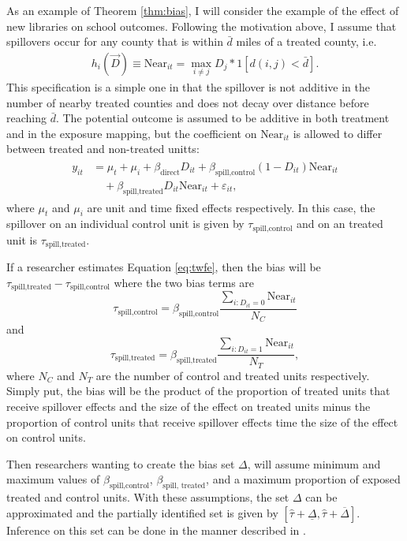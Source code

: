 \documentclass[11pt]{article}
\begin{document}
As an example of Theorem \ref{thm:bias}, I will consider the example of the effect of new libraries on school outcomes. Following the motivation above, I assume that spillovers occur for any county that is within $\bar{d}$ miles of a treated county, i.e. 
\begin{align}
    \label{eq:example_exposure}
    h_i(\vec{D}) \equiv \text{Near}_{it} = \max_{i \neq j} D_j * 1[ d(i,j) < \bar{d} ].
\end{align}
This specification is a simple one in that the spillover is not additive in the number of nearby treated counties and does not decay over distance before reaching $\bar{d}$. The potential outcome is assumed to be additive in both treatment and in the exposure mapping, but the coefficient on $\text{Near}_{it}$ is allowed to differ between treated and non-treated unitts:
\begin{align}
    \label{eq:example_po}
    \begin{split}
        y_{it} &= \mu_t + \mu_i + \beta_{\text{direct}} D_{it} + \beta_{\text{spill,control}} (1-D_{it}) \text{Near}_{it} \\
        &\quad + \beta_{\text{spill,treated}} D_{it} \text{Near}_{it} + \varepsilon_{it},
    \end{split}
\end{align}
where $\mu_t$ and $\mu_i$ are unit and time fixed effects respectively. In this case, the spillover on an individual control unit is given by $\tau_{\text{spill,control}}$ and on an treated unit is $\tau_{\text{spill,treated}}$. 

If a researcher estimates Equation \ref{eq:twfe}, then the bias will be $\tau_{\text{spill,treated}} - \tau_{\text{spill,control}}$ where the two bias terms are \[ 
    \tau_{\text{spill,control}} = \beta_{\text{spill,control}} \frac{\sum_{i: D_{it} = 0} \text{Near}_{it}}{N_C}
\] and \[ 
    \tau_{\text{spill,treated}} = \beta_{\text{spill,treated}} \frac{\sum_{i: D_{it} = 1} \text{Near}_{it}}{N_T},
\]
where $N_C$ and $N_T$ are the number of control and treated units respectively. Simply put, the bias will be the product of the proportion of treated units that receive spillover effects and the size of the effect on treated units minus the proportion of control units that receive spillover effects time the size of the effect on control units. 

Then researchers wanting to create the bias set $\Delta$, will assume minimum and maximum values of $\beta_{\text{spill,control}}$, $\beta_{\text{spill, treated}}$, and a maximum proportion of exposed treated and control units. With these assumptions, the set $\Delta$ can be approximated and the partially identified set is given by $[\hat{\tau} + \underline{\Delta}, \hat{\tau} + \overline{\Delta}]$. Inference on this set can be done in the manner described in \citet{Rambachan_Roth_2020}. 
\end{document}
